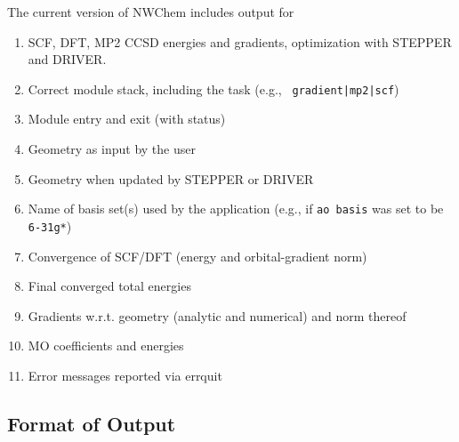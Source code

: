 The current version of NWChem includes output for
\begin{enumerate}
\item SCF, DFT, MP2 CCSD energies and gradients, optimization with STEPPER and DRIVER.
\item Correct module stack, including the task (e.g., {\tt
    gradient|mp2|scf})
\item Module entry and exit (with status)
\item Geometry as input by the user
\item Geometry when updated by STEPPER or DRIVER
\item Name of basis set(s) used by the application (e.g., if {\tt ao
    basis} was set to be \texttt{6-31g*})
\item Convergence of SCF/DFT (energy and orbital-gradient norm)
\item Final converged total energies
\item Gradients w.r.t. geometry (analytic and numerical) and norm thereof
\item MO coefficients and energies
\item Error messages reported via errquit
\end{enumerate}

\subsection{Format of Output}


